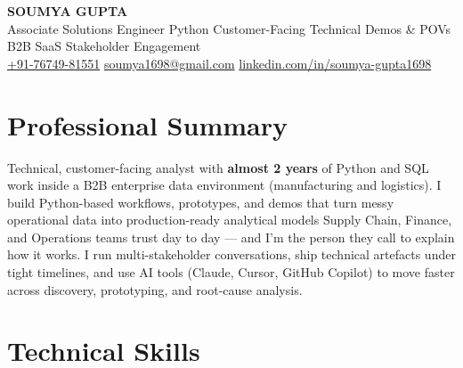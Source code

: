 \documentclass[10pt, letterpaper]{article}
\begin{document}

\begin{center}
  {\LARGE\bfseries SOUMYA GUPTA}\\[2pt]
  {\small\color{muted}Associate Solutions Engineer \textbar{} Python \textbar{} Customer-Facing Technical Demos \& POVs \textbar{} B2B SaaS \textbar{} Stakeholder Engagement}\\[3pt]
  {\small
  \href{tel:+917674981551}{+91-76749-81551}\enspace\textbullet\enspace
  \href{mailto:soumya1698@gmail.com}{soumya1698@gmail.com}\enspace\textbullet\enspace
  \href{https://linkedin.com/in/soumya-gupta1698}{linkedin.com/in/soumya-gupta1698}}
\end{center}

\vspace{-2pt}

\section{Professional Summary}

Technical, customer-facing analyst with \textbf{almost 2 years} of Python and SQL work inside a B2B enterprise data environment (manufacturing and logistics). I build Python-based workflows, prototypes, and demos that turn messy operational data into production-ready analytical models Supply Chain, Finance, and Operations teams trust day to day --- and I'm the person they call to explain how it works. I run multi-stakeholder conversations, ship technical artefacts under tight timelines, and use AI tools (Claude, Cursor, GitHub Copilot) to move faster across discovery, prototyping, and root-cause analysis.

\section{Technical Skills}
\end{document}
